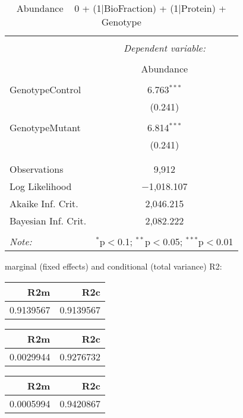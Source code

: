 \documentclass[11pt]{report}
\begin{document}
\begin{table}[!htbp] \centering 
  \caption{Abundance ~ 0 + (1|BioFraction) + (1|Protein) + Genotype} 
  \label{} 
\begin{tabular}{@{\extracolsep{5pt}}lc} 
\\[-1.8ex]\hline 
\hline \\[-1.8ex] 
 & \multicolumn{1}{c}{\textit{Dependent variable:}} \\ 
\cline{2-2} 
\\[-1.8ex] & Abundance \\ 
\hline \\[-1.8ex] 
 GenotypeControl & 6.763$^{***}$ \\ 
  & (0.241) \\ 
  & \\ 
 GenotypeMutant & 6.814$^{***}$ \\ 
  & (0.241) \\ 
  & \\ 
\hline \\[-1.8ex] 
Observations & 9,912 \\ 
Log Likelihood & $-$1,018.107 \\ 
Akaike Inf. Crit. & 2,046.215 \\ 
Bayesian Inf. Crit. & 2,082.222 \\ 
\hline 
\hline \\[-1.8ex] 
\textit{Note:}  & \multicolumn{1}{r}{$^{*}$p$<$0.1; $^{**}$p$<$0.05; $^{***}$p$<$0.01} \\ 
\end{tabular} 
\end{table} 
marginal (fixed effects) and conditional (total variance) R2:

\begin{tabular}{r|r}
\hline
R2m & R2c\\
\hline
0.9139567 & 0.9139567\\
\hline
\end{tabular}

\begin{tabular}{r|r}
\hline
R2m & R2c\\
\hline
0.0029944 & 0.9276732\\
\hline
\end{tabular}

\begin{tabular}{r|r}
\hline
R2m & R2c\\
\hline
0.0005994 & 0.9420867\\
\hline
\end{tabular}
\end{document}
